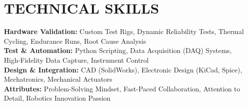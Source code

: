 \documentclass[letterpaper,11pt]{article}
\begin{document}
\section{TECHNICAL SKILLS}
 \begin{itemize}[leftmargin=0.15in, label={}]
    \small{\item{
     \textbf{Hardware Validation:} Custom Test Rigs, Dynamic Reliability Tests, Thermal Cycling, Endurance Runs, Root Cause Analysis \\
     \textbf{Test \& Automation:} Python Scripting, Data Acquisition (DAQ) Systems, High-Fidelity Data Capture, Instrument Control \\
     \textbf{Design \& Integration:} CAD (SolidWorks), Electronic Design (KiCad, Spice), Mechatronics, Mechanical Actuators \\
     \textbf{Attributes:} Problem-Solving Mindset, Fast-Paced Collaboration, Attention to Detail, Robotics Innovation Passion
    }}
 \end{itemize}


\end{document}

